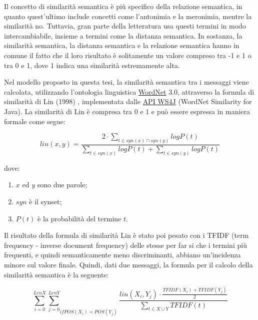 Il concetto di similarit{\`a} semantica {\`e} pi{\`u} specifico della relazione semantica, in quanto quest'ultimo include concetti come l'antonimia e la meronimia, mentre la similarit{\`a} no. Tuttavia, gran parte della letteratura usa questi termini in modo intercambiabile, insieme a termini come la distanza semantica. In sostanza, la similarit{\`a} semantica, la distanza semantica e la relazione semantica hanno in comune il fatto che il loro risultato {\`e} solitamente un valore compreso tra -1 e 1 o tra 0 e 1, dove 1 indica una similarit{\`a} estremamente alta.

Nel modello proposto in questa tesi, la similarit{\`a} semantica tra i messaggi viene calcolata, utilizzando l'ontologia linguistica \href{https://wordnet.princeton.edu/}{WordNet} 3.0, attraverso la formula di similarit{\`a} di Lin (1998) \cite{lin}, implementata dalle \href{https://code.google.com/archive/p/ws4j/}{API WS4J} (WordNet Similarity for Java). La similarit{\`a} di Lin {\`e} compresa tra 0 e 1 e pu{\`o} essere espressa in maniera formale come segue:

\begin{equation}
\label{eq:5.2}
lin(x,y) = \frac{2 \cdot \sum_{t \in syn(x) \cap syn(y)} log P(t)}{\sum_{t \in syn(x)} log P(t) + \sum_{t \in syn(y)} log P(t)}
\end{equation}

dove:

\begin{enumerate}[label=(\roman*)]
  
\item \( x \) ed \( y \) sono due parole;
\item \( syn \) {\`e} il synset;
\item \( P(t) \) {\`e} la probabilit{\`a} del termine \( t \).

\end{enumerate}

Il risultato della formula di similarit{\`a} Lin {\`e} stato poi pesato con i TFIDF (term frequency - inverse document frequency) delle stesse per far si che i termini pi{\`u} frequenti, e quindi semanticamente meno discriminanti, abbiano un'incidenza minore sul valore finale. Quindi, dati due messaggi, la formula per il calcolo della similarit{\`a} semantica {\`e} la seguente: 

\begin{equation}
\sum_{i=0}^{LenX} {\sum_{j=0}^{LenY}}_{if POS(X_{i}) = POS(Y_{j})} \frac{lin(X_{i},Y_{j}) \cdot \frac{TFIDF(X_{i}) + TFIDF(Y_{j})}{2}}{\sum_{t \in X \cup Y} TFIDF(t)}
\end{equation}

